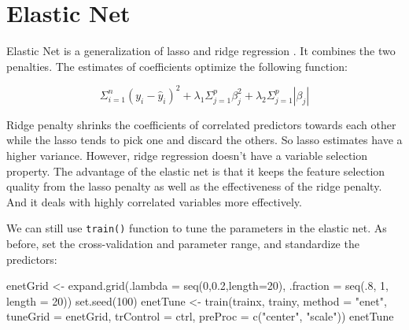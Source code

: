 \documentclass[
  12pt,
]{krantz}
\makeatletter
\newenvironment{Shaded}{\begin{snugshade}}{\end{snugshade}}
\newcommand{\AttributeTok}[1]{\textcolor[rgb]{0.61,0.61,0.61}{#1}}
\newcommand{\DecValTok}[1]{\textcolor[rgb]{0.06,0.06,0.06}{#1}}
\newcommand{\FloatTok}[1]{\textcolor[rgb]{0.06,0.06,0.06}{#1}}
\newcommand{\FunctionTok}[1]{\textcolor[rgb]{0,0,0}{#1}}
\newcommand{\NormalTok}[1]{#1}
\newcommand{\OtherTok}[1]{\textcolor[rgb]{0.37,0.37,0.37}{#1}}
\newcommand{\StringTok}[1]{\textcolor[rgb]{0.5,0.5,0.5}{#1}}
\newenvironment{kframe}{%
\medskip{}
\setlength{\fboxsep}{.8em}
 \def\at@end@of@kframe{}%
 \ifinner\ifhmode%
  \def\at@end@of@kframe{\end{minipage}}%
  \begin{minipage}{\columnwidth}%
 \fi\fi%
 \def\FrameCommand##1{\hskip\@totalleftmargin \hskip-\fboxsep
 \colorbox{shadecolor}{##1}\hskip-\fboxsep
     \hskip-\linewidth \hskip-\@totalleftmargin \hskip\columnwidth}%
 \MakeFramed {\advance\hsize-\width
   \@totalleftmargin\z@ \linewidth\hsize
   \@setminipage}}%
 {\par\unskip\endMakeFramed%
 \at@end@of@kframe}
\renewenvironment{Shaded}{\begin{kframe}}{\end{kframe}}
\makeatother
\begin{document}
\hypertarget{elastic-net}{%
\section{Elastic Net}\label{elastic-net}}

Elastic Net is a generalization of lasso and ridge regression \citep{zou2005}. It combines the two penalties. The estimates of coefficients optimize the following function:

\begin{equation}
\Sigma_{i=1}^{n}(y_{i}-\hat{y}_{i})^{2}+\lambda_{1}\Sigma_{j=1}^{p}\beta_{j}^{2}+\lambda_{2}\Sigma_{j=1}^{p}|\beta_{j}|
\label{eq:elasticnet}
\end{equation}

Ridge penalty shrinks the coefficients of correlated predictors towards each other while the lasso tends to pick one and discard the others. So lasso estimates have a higher variance. However, ridge regression doesn't have a variable selection property. The advantage of the elastic net is that it keeps the feature selection quality from the lasso penalty as well as the effectiveness of the ridge penalty. And it deals with highly correlated variables more effectively.

We can still use \texttt{train()} function to tune the parameters in the elastic net. As before, set the cross-validation and parameter range, and standardize the predictors:

\begin{Shaded}
\begin{Highlighting}[]
\NormalTok{enetGrid }\OtherTok{\textless{}{-}} \FunctionTok{expand.grid}\NormalTok{(}\AttributeTok{.lambda =} \FunctionTok{seq}\NormalTok{(}\DecValTok{0}\NormalTok{,}\FloatTok{0.2}\NormalTok{,}\AttributeTok{length=}\DecValTok{20}\NormalTok{), }
                        \AttributeTok{.fraction =} \FunctionTok{seq}\NormalTok{(.}\DecValTok{8}\NormalTok{, }\DecValTok{1}\NormalTok{, }\AttributeTok{length =} \DecValTok{20}\NormalTok{))}
\FunctionTok{set.seed}\NormalTok{(}\DecValTok{100}\NormalTok{)}
\NormalTok{enetTune }\OtherTok{\textless{}{-}} \FunctionTok{train}\NormalTok{(trainx, trainy,}
                  \AttributeTok{method =} \StringTok{"enet"}\NormalTok{,}
                  \AttributeTok{tuneGrid =}\NormalTok{ enetGrid,}
                  \AttributeTok{trControl =}\NormalTok{ ctrl,}
                  \AttributeTok{preProc =} \FunctionTok{c}\NormalTok{(}\StringTok{"center"}\NormalTok{, }\StringTok{"scale"}\NormalTok{))}
\NormalTok{enetTune}
\end{Highlighting}
\end{Shaded}
\end{document}
